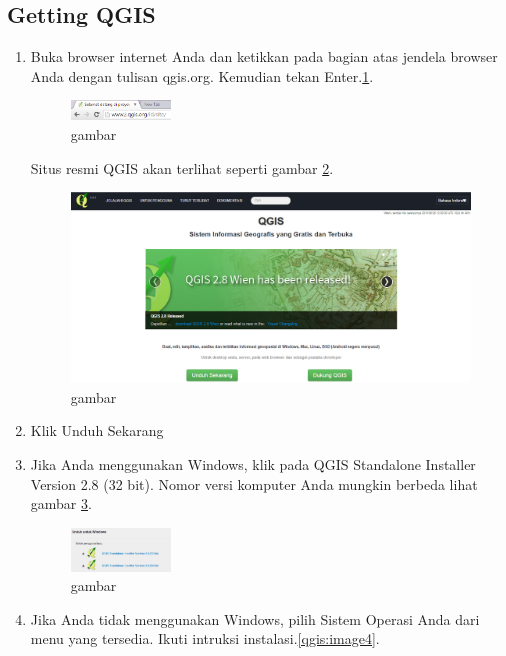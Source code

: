 \subsection{Getting QGIS}
\begin{enumerate}
\item
Buka browser internet Anda dan ketikkan pada bagian atas jendela browser Anda dengan tulisan qgis.org. Kemudian tekan Enter.\ref{qgis:image1}.
\begin{figure}[ht]
        \centerline{\includegraphics[width=0.25\textwidth]{figures/image1}}
        \caption{gambar}
        \label{qgis:image1}
        \end{figure}

Situs resmi QGIS akan terlihat seperti gambar \ref{qgis:image2}.
\begin{figure}[ht]
        \centerline{\includegraphics[width=1.00\textwidth]{figures/image2}}
        \caption{gambar}
        \label{qgis:image2}
        \end{figure}
\item
Klik Unduh Sekarang
\item
Jika Anda menggunakan Windows, klik pada QGIS Standalone Installer Version 2.8 (32 bit). Nomor versi komputer Anda mungkin berbeda lihat gambar \ref{qgis:image3}.
\begin{figure}[ht]
        \centerline{\includegraphics[width=0.25\textwidth]{figures/image3}}
        \caption{gambar}
        \label{qgis:image3}
        \end{figure}
\item
Jika Anda tidak menggunakan Windows, pilih Sistem Operasi Anda dari menu yang tersedia. Ikuti intruksi instalasi.\ref{qgis:image4}.

\end{enumerate}
